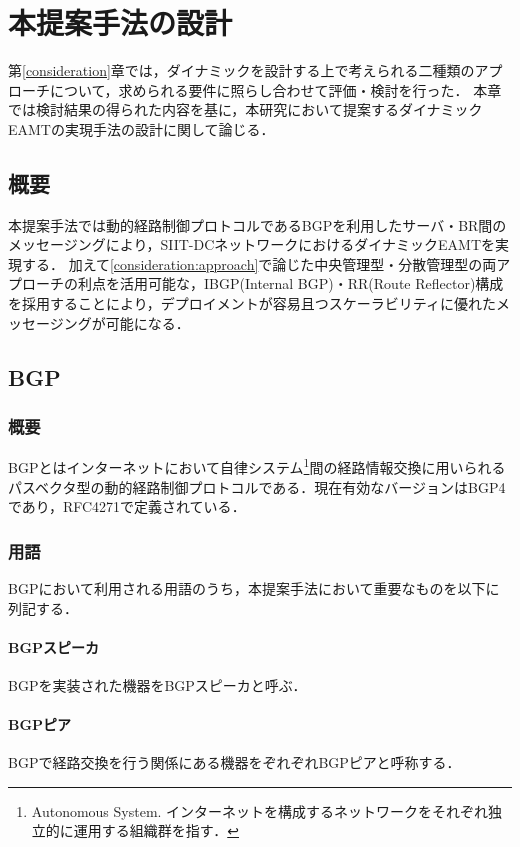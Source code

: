 \chapter{本提案手法の設計}
\label{proposal}
第\ref{consideration}章では，ダイナミックを設計する上で考えられる二種類のアプローチについて，求められる要件に照らし合わせて評価・検討を行った．
本章では検討結果の得られた内容を基に，本研究において提案するダイナミックEAMTの実現手法の設計に関して論じる．

\section{概要}
本提案手法では動的経路制御プロトコルであるBGPを利用したサーバ・BR間のメッセージングにより，SIIT-DCネットワークにおけるダイナミックEAMTを実現する．
加えて\ref{consideration:approach}で論じた中央管理型・分散管理型の両アプローチの利点を活用可能な，IBGP(Internal BGP)・RR(Route Reflector)構成を採用することにより，デプロイメントが容易且つスケーラビリティに優れたメッセージングが可能になる．

\section{BGP}
\subsection{概要}
BGPとはインターネットにおいて自律システム\footnote{Autonomous System. インターネットを構成するネットワークをそれぞれ独立的に運用する組織群を指す．}間の経路情報交換に用いられるパスベクタ型の動的経路制御プロトコルである．現在有効なバージョンはBGP4であり，RFC4271で定義されている\cite{RFC4271}．


\subsection{用語}
BGPにおいて利用される用語のうち，本提案手法において重要なものを以下に列記する．

\subsubsection{BGPスピーカ}
BGPを実装された機器をBGPスピーカと呼ぶ．

\subsubsection{BGPピア}
BGPで経路交換を行う関係にある機器をぞれぞれBGPピアと呼称する．

